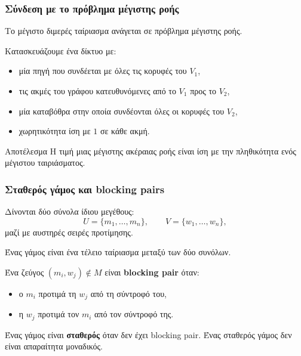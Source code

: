 \documentclass{beamer}
\begin{document}
	\begin{frame}
		\frametitle{Σύνδεση με το πρόβλημα μέγιστης ροής}
		
		Το μέγιστο διμερές ταίριασμα ανάγεται σε πρόβλημα μέγιστης ροής.
		
		Κατασκευάζουμε ένα δίκτυο με:
		
		\begin{itemize}
			\item μία πηγή που συνδέεται με όλες τις κορυφές του $V_1$,
			\item τις ακμές του γράφου κατευθυνόμενες από το $V_1$ προς το $V_2$,
			\item μία καταβόθρα στην οποία συνδέονται όλες οι κορυφές του $V_2$,
			\item χωρητικότητα ίση με $1$ σε κάθε ακμή.
		\end{itemize}
		
		\begin{block}{Αποτέλεσμα}
			Η τιμή μιας μέγιστης ακέραιας ροής είναι ίση με την πληθικότητα ενός μέγιστου ταιριάσματος.
		\end{block}
	\end{frame}
	
	
	\begin{frame}
		\frametitle{Σταθερός γάμος και blocking pairs}
		
		Δίνονται δύο σύνολα ίδιου μεγέθους:
		\[
		U=\{m_1,\ldots,m_n\},
		\qquad
		V=\{w_1,\ldots,w_n\},
		\]
		μαζί με αυστηρές σειρές προτίμησης.
		
		Ένας γάμος είναι ένα τέλειο ταίριασμα μεταξύ των δύο συνόλων.
		
		\vspace{0.2cm}
		
		Ένα ζεύγος $(m_i,w_j)\notin M$ είναι \textbf{blocking pair} όταν:
		
		\begin{itemize}
			\item ο $m_i$ προτιμά τη $w_j$ από τη σύντροφό του,
			\item η $w_j$ προτιμά τον $m_i$ από τον σύντροφό της.
		\end{itemize}
		
		Ένας γάμος είναι \textbf{σταθερός} όταν δεν έχει blocking pair. Ένας σταθερός γάμος δεν είναι απαραίτητα μοναδικός.
	\end{frame}
	
\end{document}
